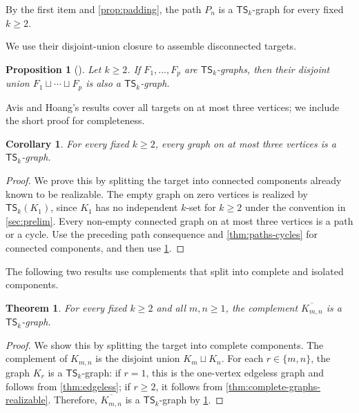 \documentclass[a4paper]{article}
\theoremstyle{plain}
\newtheorem{theorem}{Theorem}[section]
\newtheorem{corollary}[corollary]{Corollary}
\newtheorem{proposition}[proposition]{Proposition}
\theoremstyle{definition}
\newcommand{\TSsym}{\mathsf{TS}}
\numberwithin{equation}{section}
\begin{document}
By the first item and \cref{prop:padding}, the path $P_n$ is a $\TSsym_k$-graph for every fixed $k\ge 2$.

We use their disjoint-union closure to assemble disconnected targets.

\begin{proposition}[{\cite[Prop.~10(a)]{AvisHoang2023}}]
\label{prop:target-disjoint-union}
Let $k\ge 2$.
If $F_1,\dots,F_p$ are $\TSsym_k$-graphs, then their disjoint union $F_1\sqcup\cdots\sqcup F_p$ is also a $\TSsym_k$-graph.
\end{proposition}

Avis and Hoang's results cover all targets on at most three vertices; we include the short proof for completeness.

\begin{corollary}
\label{cor:small-graphs-realizable}
For every fixed $k\ge 2$, every graph on at most three vertices is a $\TSsym_k$-graph.
\end{corollary}

\begin{proof}
We prove this by splitting the target into connected components already known to be realizable.
The empty graph on zero vertices is realized by $\TSsym_k(K_1)$, since $K_1$ has no independent $k$-set for $k\ge 2$ under the convention in \cref{sec:prelim}.
Every non-empty connected graph on at most three vertices is a path or a cycle.
Use the preceding path consequence and \cref{thm:paths-cycles} for connected components, and then use \cref{prop:target-disjoint-union}.
\end{proof}

The following two results use complements that split into complete and isolated components.

\begin{theorem}
\label{thm:complement-complete-bipartite}
For every fixed $k\ge 2$ and all $m,n\ge 1$, the complement $\overline{K_{m,n}}$ is a $\TSsym_k$-graph.
\end{theorem}

\begin{proof}
We show this by splitting the target into complete components.
The complement of $K_{m,n}$ is the disjoint union $K_m\sqcup K_n$.
For each $r\in\{m,n\}$, the graph $K_r$ is a $\TSsym_k$-graph: if $r=1$, this is the one-vertex edgeless graph and follows from \cref{thm:edgeless}; if $r\ge 2$, it follows from \cref{thm:complete-graphs-realizable}.
Therefore, $\overline{K_{m,n}}$ is a $\TSsym_k$-graph by \cref{prop:target-disjoint-union}.
\end{proof}
\end{document}
